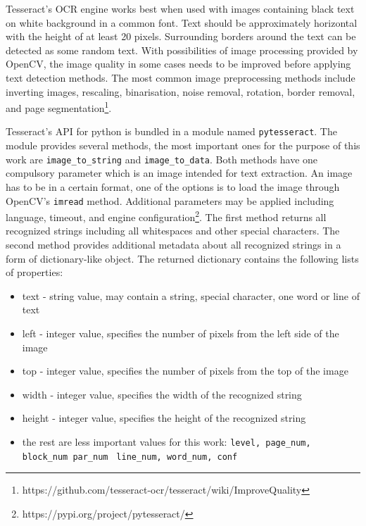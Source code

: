 Tesseract's OCR engine works best when used with images containing black text on white background in a common font. Text should be approximately horizontal with the height of at least 20 pixels. Surrounding borders around the text can be detected as some random text. With possibilities of image processing provided by OpenCV, the image quality in some cases needs to be improved before applying text detection methods. The most common image preprocessing methods include inverting images, rescaling, binarisation, noise removal, rotation, border removal, and page segmentation\footnote{https://github.com/tesseract-ocr/tesseract/wiki/ImproveQuality}.

Tesseract's API for python is bundled in a module named \texttt{pytesseract}. The module provides several methods, the most important ones for the purpose of this work are \verb|image_to_string| and \verb|image_to_data|. Both methods have one compulsory parameter which is an image intended for text extraction. An image has to be in a certain format, one of the options is to load the image through OpenCV's \texttt{imread} method. Additional parameters may be applied including language, timeout, and engine configuration\footnote{https://pypi.org/project/pytesseract/}. The first method returns all recognized strings including all whitespaces and other special characters. The second method provides additional metadata about all recognized strings in a form of dictionary-like object. The returned dictionary contains the following lists of properties:

\begin{itemize}
    \item text - string value, may contain a string, special character, one word or line of text
    \item left - integer value, specifies the number of pixels from the left side of the image 
    \item top - integer value, specifies the number of pixels from the top of the image
    \item width - integer value, specifies the width of the recognized string 
    \item height - integer value, specifies the height of the recognized string
    \item the rest are less important values for this work: \verb|level, page_num, block_num par_num|
    \verb| line_num, word_num, conf|
\end{itemize}

